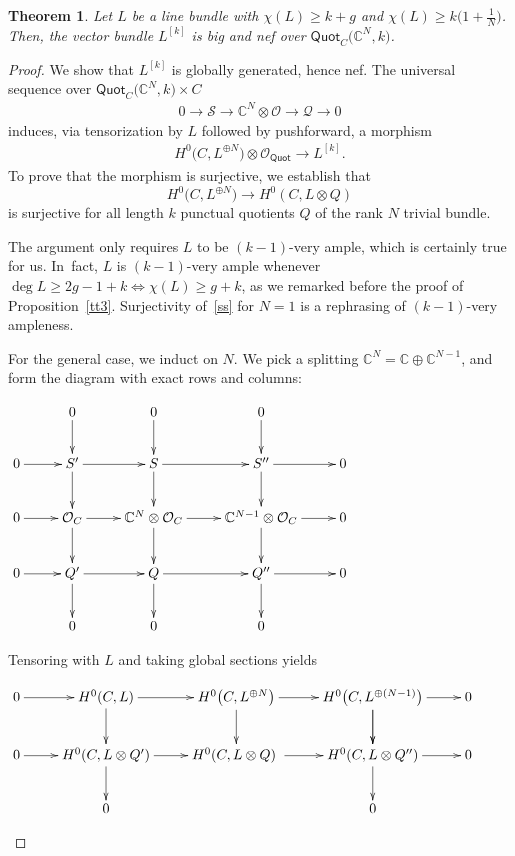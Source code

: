 \documentclass[pdftex]{sigma}
\numberwithin{equation}{section}
\newtheorem{Theorem}{Theorem}[section]
\begin{document}
\begin{Theorem} \label{quotpun}
Let $L$ be a line bundle with $\chi (L)\geq k+g$ and $\chi(L)\geq k\big(1+\frac{1}{N}\big)$. Then, the vector bundle $L^{[k]}$ is big and nef over $\mathsf {Quot}_C\big(\mathbb C^N, k\big)$.
\end{Theorem}

\begin{proof} We show that $L^{[k]}$ is globally generated, hence nef. The universal sequence over $\mathsf {Quot}_C\big(\mathbb C^N, k\big)\times C$
\begin{gather*}
0\to \mathcal S\to \mathbb C^N\otimes \mathcal O\to \mathcal Q\to 0
\end{gather*}
induces, via tensorization by $L$ followed by pushforward, a morphism
\begin{gather*}
H^0\bigl(C, L^{\oplus N}\bigr)\otimes \mathcal O_{\mathsf{Quot}}\to L^{[k]}.
\end{gather*}
To prove that the morphism is surjective, we establish that
\begin{equation}\label{ss}
H^0\bigl(C, L^{\oplus N}\bigr)\to H^0(C, L\otimes Q)
\end{equation}
is surjective for all length $k$ punctual quotients $Q$ of the rank $N$ trivial bundle.

The argument only requires $L$ to be $(k-1)$-very ample, which is certainly true for us. In~fact, $L$ is $(k-1)$-very ample whenever $\deg L\geq 2g-1+k\iff \chi(L)\geq g+k$, as we remarked before the proof of Proposition~\ref{tt3}. Surjectivity of~\eqref{ss} for $N=1$ is a rephrasing of $(k-1)$-very ampleness.

For the general case, we induct on $N$. We pick a splitting $\mathbb C^N=\mathbb C\oplus \mathbb C^{N-1}$, and form the diagram with exact rows and columns:
\begin{center}
$\xymatrix{
& \ar[d] 0 & \ar[d]0 & \ar[d]0 &\\
0\ar[r] & S' \ar[r]\ar[d] & S\ar[r]\ar[d] & S''\ar[r]\ar[d] & 0 \\
0\ar[r] & \mathcal O_C \ar[r]\ar[d]& \mathbb C^{N}\otimes \mathcal O_{C}\ar[r]\ar[d] &\mathbb C^{N-1}\otimes \mathcal O_{C} \ar[r]\ar[d]& 0 \\
0\ar[r] & Q' \ar[r]\ar[d] & Q\ar[r]\ar[d] & Q''\ar[r]\ar[d] & 0\\
& 0 & 0 & 0 & }$
\end{center}
Tensoring with $L$ and taking global sections yields
\begin{center}
$\xymatrix{
 0\ar[r] & \ar[r]\ar[d]H^0(C, L)& \ar[r]\ar[d]H^0\big(C, L^{\oplus N}\big) & \ar[r] \ar[d]H^0\big(C, L^{\oplus (N-1)}\big)\ar[d] &0\\
0 \ar[r]& H^0(C, L\otimes Q')\ar[r]\ar[d] & H^0(C, L\otimes Q)\ar[r]\ & H^0(C, L\otimes Q'')\ar[r] \ar[d] & 0 \\
 & 0 & & 0 & }$
\end{center}


\end{proof}
\end{document}
